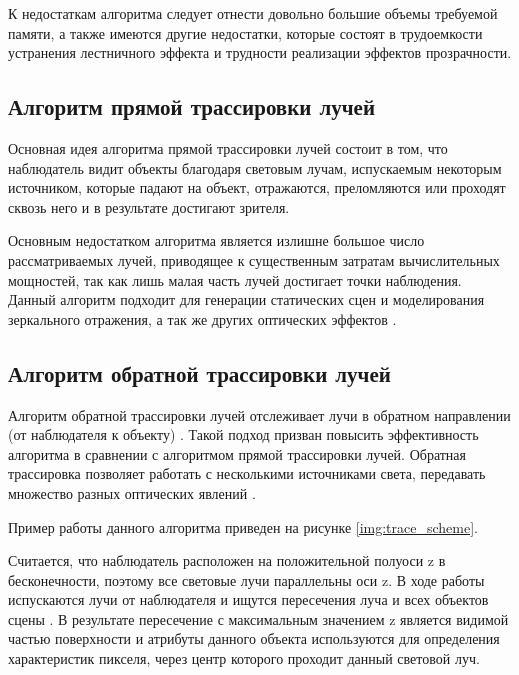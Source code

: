             
            К недостаткам алгоритма следует отнести довольно большие объемы требуемой памяти, а также имеются другие недостатки, которые состоят в трудоемкости устранения лестничного эффекта и трудности реализации эффектов прозрачности.
        
        \subsection{Алгоритм прямой трассировки лучей}
        
            Основная идея алгоритма прямой трассировки лучей \cite{shykin} состоит в том, что наблюдатель видит объекты благодаря световым лучам, испускаемым некоторым источником, которые падают на объект, отражаются, преломляются или проходят сквозь него и в результате достигают зрителя.
            
            Основным недостатком алгоритма является излишне большое число рассматриваемых лучей, приводящее к существенным затратам вычислительных мощностей, так как лишь малая часть лучей достигает точки наблюдения. Данный алгоритм подходит для генерации статических сцен и моделирования зеркального отражения, а так же других оптических эффектов \cite{traceproblem}.
        
        \subsection{Алгоритм обратной трассировки лучей}
        
            Алгоритм обратной трассировки лучей отслеживает лучи в обратном направлении (от наблюдателя к объекту) \cite{shykin}. Такой подход призван повысить эффективность алгоритма в сравнении с алгоритмом прямой трассировки лучей. Обратная трассировка позволяет работать с несколькими источниками света, передавать множество разных оптических явлений \cite{snizko}.
            
            Пример работы данного алгоритма приведен на рисунке \ref{img:trace_scheme}.
            
            
            Считается, что наблюдатель расположен на положительной полуоси z в бесконечности, поэтому все световые лучи параллельны оси z. В ходе работы испускаются лучи от наблюдателя и ищутся пересечения луча и всех объектов сцены \cite{bayackovskiy}. В результате пересечение с максимальным значением z является видимой частью поверхности и атрибуты данного объекта используются для определения характеристик пикселя, через центр которого проходит данный световой луч. 
            

